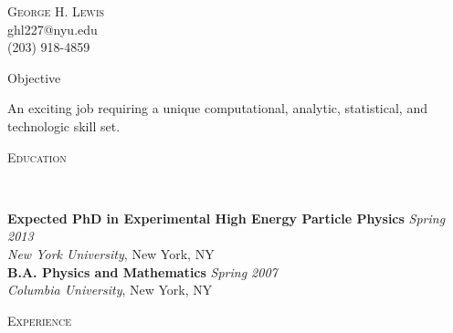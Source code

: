 \documentclass[9pt]{article}
\newenvironment{changemargin}[2]{%
  \begin{list}{}{%
    \setlength{\topsep}{0pt}%
    \setlength{\leftmargin}{#1}%
    \setlength{\rightmargin}{#2}%
    \setlength{\listparindent}{\parindent}%
    \setlength{\itemindent}{\parindent}%
    \setlength{\parsep}{\parskip}%
  }%
  \item[]}{\end{list}
}
\newcommand{\lineover}{
	\begin{changemargin}{-0.05in}{-0.05in}
		\vspace*{-8pt}
		\hrulefill \\
		\vspace*{-2pt}
	\end{changemargin}
}
\newcommand{\header}[1]{
	\begin{changemargin}{-0.5in}{-0.5in}
		\scshape{#1}\\
  	\lineover
	\end{changemargin}
}
\newcommand{\contact}[4]{
	\begin{changemargin}{-0.5in}{-0.5in}
		\begin{center}
			{\Large \scshape {#1}}\\ \smallskip
			{#2}\\ \smallskip 
			{#3}\\ \smallskip
			{#4}\smallskip
		\end{center}
	\end{changemargin}
}
\newenvironment{body} {
	\vspace*{-16pt}
	\begin{changemargin}{-0.25in}{-0.5in}
  }	
	{\end{changemargin}
}
\begin{document}
\contact{George H. Lewis}{ghl227@nyu.edu}{(203) 918-4859}


\header{Objective}

\begin{body}
	\vspace{14pt}
	An exciting job requiring a unique computational, analytic, statistical, and technologic skill set.
\end{body}

\smallskip


\header{Education}

\begin{body}
	\vspace{14pt}
	\textbf{Expected PhD in Experimental High Energy Particle Physics }{} \hfill \emph{Spring 2013}{} \\
	\emph{New York University}, New York, NY{} \\
  \medskip
	\textbf{B.A. Physics and Mathematics} \hfill \emph{Spring 2007} \\
	\emph{Columbia University}, New York, NY\\
\end{body}

\smallskip


\header{Experience}
\end{document}

